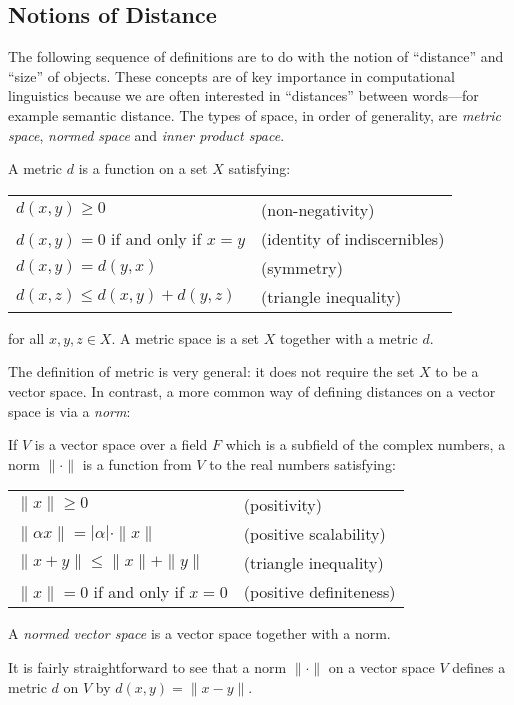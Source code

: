 \subsection{Notions of Distance}

The following sequence of definitions are to do with the notion of ``distance'' and ``size'' of objects. These concepts are of key importance in computational linguistics because we are often interested in ``distances'' between words---for example semantic distance. The types of space, in order of generality, are \emph{metric space}, \emph{normed space} and \emph{inner product space}.
\begin{defn}[Metric]
A metric $d$ is a function on a set $X$ satisfying:
\begin{center}
\begin{tabular}{ll}
$d(x,y) \ge 0$ & (non-negativity)\\
$d(x,y) = 0$ if and only if $x=y$ & (identity of indiscernibles)\\
$d(x,y) = d(y,x)$ & (symmetry)\\
$d(x,z) \le d(x,y) + d(y,z)$ & (triangle inequality)
\end{tabular}
\end{center}
for all $x,y,z \in X$. A metric space is a set $X$ together with a metric $d$.
\end{defn}

The definition of metric is very general: it does not require the set $X$ to be a vector space. In contrast, a more common way of defining distances on a vector space is via a \emph{norm}:
\begin{defn}[Norm]
If $V$ is a vector space over a field $F$ which is a subfield of the complex numbers, a norm $\|\cdot\|$ is a function from $V$ to the real numbers satisfying:
\begin{center}
\begin{tabular}{ll}
$\|x\| \ge 0$ & (positivity)\\
$\|\alpha x\| = |\alpha|\cdot\|x\|$ & (positive scalability)\\
$\|x + y\| \le \|x\| + \|y\|$ & (triangle inequality)\\
$\|x\| = 0$ if and only if $x = 0$ & (positive definiteness)
\end{tabular}
\end{center}
A \emph{normed vector space} is a vector space together with a norm.
\end{defn}
It is fairly straightforward to see that a norm $\|\cdot\|$ on a vector space $V$ defines a metric $d$ on $V$ by $d(x,y) = \|x - y\|$.


